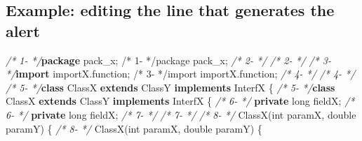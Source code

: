 \documentclass[
]{article}
\newenvironment{Shaded}{\begin{snugshade}}{\end{snugshade}}
\newcommand{\CommentTok}[1]{\textcolor[rgb]{0.56,0.35,0.01}{\textit{#1}}}
\newcommand{\DataTypeTok}[1]{\textcolor[rgb]{0.13,0.29,0.53}{#1}}
\newcommand{\FunctionTok}[1]{\textcolor[rgb]{0.00,0.00,0.00}{#1}}
\newcommand{\ImportTok}[1]{#1}
\newcommand{\KeywordTok}[1]{\textcolor[rgb]{0.13,0.29,0.53}{\textbf{#1}}}
\newcommand{\NormalTok}[1]{#1}
\begin{document}
\begin{landscape}

\subsection{Example: editing the line that generates the alert} \label{example_editing_line}

\small

\normalsize

\scriptsize

\begin{Shaded}
\begin{Highlighting}[]
\CommentTok{/*  1-                 */}\KeywordTok{package}\ImportTok{ pack_x;                                                /*  1-                 */package pack_x;}                                                
\CommentTok{/*  2-                 */}                                                               \CommentTok{/*  2-                 */}                                                               
\CommentTok{/*  3-                 */}\KeywordTok{import}\ImportTok{ importX.function;                                       /*  3-                 */import importX.function;}                                       
\CommentTok{/*  4-                 */}                                                               \CommentTok{/*  4-                 */}                                                               
\CommentTok{/*  5-                 */}\KeywordTok{class}\NormalTok{ ClassX }\KeywordTok{extends}\NormalTok{ ClassY }\KeywordTok{implements}\NormalTok{ InterfX \{               }\CommentTok{/*  5-                 */}\KeywordTok{class}\NormalTok{ ClassX }\KeywordTok{extends}\NormalTok{ ClassY }\KeywordTok{implements}\NormalTok{ InterfX \{               }
\CommentTok{/*  6-                 */}    \KeywordTok{private} \DataTypeTok{long}\NormalTok{ fieldX;                                       }\CommentTok{/*  6-                 */}    \KeywordTok{private} \DataTypeTok{long}\NormalTok{ fieldX;                                       }
\CommentTok{/*  7-                 */}                                                               \CommentTok{/*  7-                 */}                                                               
\CommentTok{/*  8-                 */}    \FunctionTok{ClassX}\NormalTok{(}\DataTypeTok{int}\NormalTok{ paramX, }\DataTypeTok{double}\NormalTok{ paramY) \{                                }\CommentTok{/*  8-                 */}    \FunctionTok{ClassX}\NormalTok{(}\DataTypeTok{int}\NormalTok{ paramX, }\DataTypeTok{double}\NormalTok{ paramY) \{                                }

\end{Highlighting}
\end{Shaded}
\end{landscape}
\end{document}
